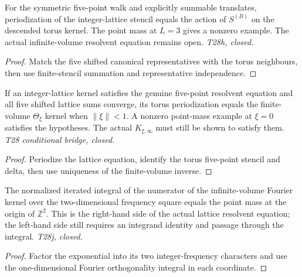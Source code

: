 \begin{lemma}
  \label{lem:periodize-torus-stencil}
  \leanok
  For the symmetric five-point walk and explicitly summable translates,
  periodization of the integer-lattice stencil equals the action of $S^{(B)}$
  on the descended torus kernel. The point mass at $L=3$ gives a nonzero
  example. The actual infinite-volume resolvent equation remains open.
  \emph{T28h, closed.}
\end{lemma}
\begin{proof}\leanok
  Match the five shifted canonical representatives with the torus neighbours,
  then use finite-stencil summation and representative independence.
\end{proof}

\begin{lemma}
  \label{lem:periodize-resolvent-bridge}
  \leanok
  If an integer-lattice kernel satisfies the genuine five-point resolvent
  equation and all five shifted lattice sums converge, its torus
  periodization equals the finite-volume $\Theta_\xi$ kernel when
  $\|\xi\|<1$. A nonzero point-mass example at $\xi=0$ satisfies the
  hypotheses. The actual $K_{\xi,\infty}$ must still be shown to satisfy
  them. \emph{T28 conditional bridge, closed.}
\end{lemma}
\begin{proof}\leanok
  Periodize the lattice equation, identify the torus five-point stencil and
  delta, then use uniqueness of the finite-volume inverse.
\end{proof}

\begin{lemma}
  \label{lem:periodize-fourier-delta}
  \leanok
  The normalized iterated integral of the numerator of the infinite-volume
  Fourier kernel over the two-dimensional frequency square equals the point
  mass at the origin of $\mathbb Z^2$. This is the right-hand side of the
  actual lattice resolvent equation; the left-hand side still requires an
  integrand identity and passage through the integral.
  \emph{T28j, closed.}
\end{lemma}
\begin{proof}\leanok
  Factor the exponential into its two integer-frequency characters and use
  the one-dimensional Fourier orthogonality integral in each coordinate.
\end{proof}

